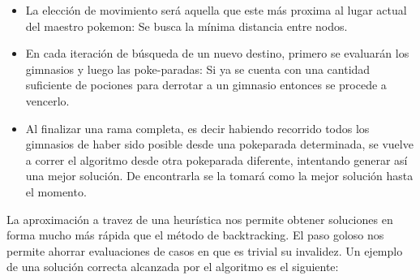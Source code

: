 \begin{itemize}
\item La elección de movimiento será aquella que este más proxima al lugar actual del maestro pokemon: Se busca la m\'inima distancia entre nodos. 
\item En cada iteraci\'on de b\'usqueda de un nuevo destino, primero se evaluarán los gimnasios y luego las poke-paradas: Si ya se cuenta con una cantidad suficiente de pociones para derrotar a un gimnasio entonces se procede a vencerlo.
\item Al finalizar una rama completa, es decir habiendo recorrido todos los gimnasios de haber sido posible desde una pokeparada determinada, se vuelve a correr el algoritmo desde otra pokeparada diferente, intentando generar así una mejor solución. De encontrarla se la tomará como la mejor solución hasta el momento.
\end{itemize}
 



La aproximación a travez de una heurística nos permite obtener soluciones en forma mucho más rápida que el método de backtracking. El paso goloso nos permite ahorrar evaluaciones de casos en que es trivial su invalidez. Un ejemplo de una solución correcta alcanzada por el algoritmo es el siguiente:

